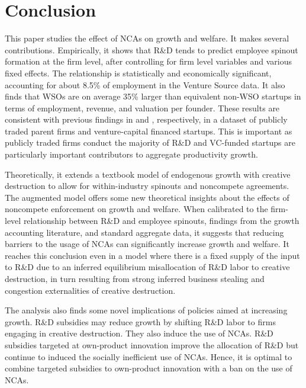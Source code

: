 \documentclass[ecta,nameyear,final]{econsocart}
\theoremstyle{definition}
\begin{document}
\section{Conclusion}\label{sec:conclusion}
 
This paper studies the effect of NCAs on growth and welfare. It makes several contributions. Empirically, it shows that R\&D tends to predict employee spinout formation at the firm level, after controlling for firm level variables and various fixed effects. The relationship is statistically and economically significant, accounting for about 8.5\% of employment in the Venture Source data. It also finds that WSOs are on average 35\% larger than equivalent non-WSO startups in terms of employment, revenue, and valuation per founder. These results are consistent with previous findings in \cite{babina_entrepreneurial_2019} and \cite{muendler_employee_2012}, respectively, in a dataset of publicly traded parent firms and venture-capital financed startups. This is important as publicly traded firms conduct the majority of R\&D and VC-funded startups are particularly important contributors to aggregate productivity growth. 

Theoretically, it extends a textbook model of endogenous growth with creative destruction to allow for within-industry spinouts and noncompete agreements. The augmented model offers some new theoretical insights about the effects of noncompete enforcement on growth and welfare. When calibrated to the firm-level relationship between R\&D and employee spinouts, findings from the growth accounting literature, and standard aggregate data, it suggests that reducing barriers to the usage of NCAs can significantly increase growth and welfare. It reaches this conclusion even in a model where there is a fixed supply of the input to R\&D due to an inferred equilibrium misallocation of R\&D labor to creative destruction, in turn resulting from strong inferred business stealing and congestion externalities of creative destruction.

The analysis also finds some novel implications of policies aimed at increasing growth. R\&D subsidies may reduce growth by shifting R\&D labor to firms engaging in creative destruction. They also induce the use of NCAs. R\&D subsidies targeted at own-product innovation improve the allocation of R\&D but continue to induced the socially inefficient use of NCAs. Hence, it is optimal to combine targeted subsidies to own-product innovation with a ban on the use of NCAs. 
\end{document}
